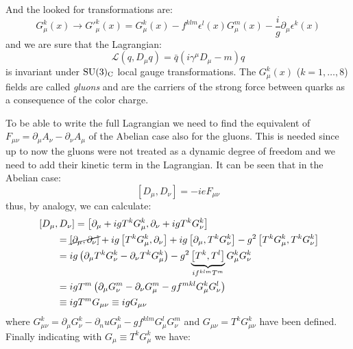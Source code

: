 And the looked for transformations are:
\begin{equation}
  \label{eq:138}
  G_\mu^k(x) \rightarrow {G'}_\mu^k(x) = G_\mu^k(x) -
  f^{klm}\epsilon^l(x)G_\mu^m(x) - \frac{i}{g}\partial_\mu \epsilon^k(x)
\end{equation}
and we are sure that the Lagrangian:
\begin{equation}
\mathcal{L}(q, D_\mu q)\label{eq:139} = \bar{q}\left( i \gamma^\mu D_\mu - m \right) q
\end{equation}
is invariant under $\mathrm{SU}(3)_\mathrm{C}$ local gauge transformations. The $G_\mu^k(x)$ ($k
= 1, \dots, 8$) fields are called \emph{gluons} and are the carriers of the
strong force between quarks as a consequence of the color charge.

To be able to write the full Lagrangian we need to find the equivalent of
$F_{\mu\nu} = \partial_\mu A_\nu - \partial_\nu A_\mu$ of the Abelian case also
for the gluons. This is needed since up to now the gluons were not treated as a
dynamic degree of freedom and we need to add their kinetic term in the
Lagrangian. It can be seen that in the Abelian case:
\begin{equation}
  \label{eq:140}
  \left[D_\mu, D_\nu \right] = -ieF_{\mu\nu}
\end{equation}
thus, by analogy, we can calculate:
\begin{equation}
  \label{eq:141}
  \begin{aligned}
    \MoveEqLeft \left[D_\mu, D_\nu \right] = \left[\partial_\mu + ig T^k G_\mu^k, \partial_\nu +
      ig T^k G_\nu^k \right] \\
    & = \cancel{\left[\partial_\mu, \partial_\nu \right]} + ig
    \left[T^kG_\mu^k, \partial_\nu \right] + ig \left[\partial_\mu, T^kG_\nu^k
    \right] - g^2 \left[T^kG_\mu^k, T^kG_\nu^k
    \right] \\
    & = ig \left( \partial_\mu T^kG_\nu^k - \partial_\nu T^k G_\mu^k \right) -
    g^2 \underbrace{\left[T^k, T^l \right]}_{if^{klm}T^m} G_\mu^k G_\nu^k \\
    & = ig T^m \left( \partial_\mu G_\nu^m - \partial_\nu G_\mu^m - g f^{mkl}
      G_\mu^k G_\nu^l\right) \\
    & \equiv ig T^m G_{\mu\nu} \equiv ig G_{\mu\nu}
  \end{aligned}
\end{equation}
where $G_{\mu\nu}^k = \partial_\mu G_\nu^k -
\partial_nu G_\mu^k - g f^{klm} G_\mu^l G_\nu^m$ and
$G_{\mu\nu} = T^k G_{\mu\nu}^k$ have been defined. Finally indicating with
$G_\mu \equiv T^k G_\mu^k$ we have:

